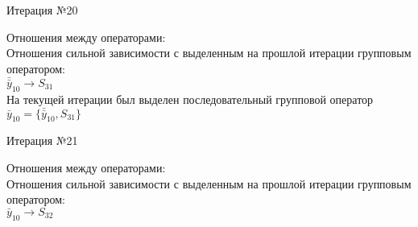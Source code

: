 \documentclass[a4paper,14pt]{article}
\begin{document}
\begin{center} Итерация №20 \end{center}
Отношения между операторами: \\
Отношения сильной зависимости с выделенным на прошлой итерации групповым оператором: \\ \newline
\begin{math}
    \bar{\bar{y}}_{10} \rightarrow S_{31}
\end{math}\\ \newline
%
На текущей итерации был выделен последовательный групповой оператор $\bar{y}_{10} = \{\bar{\bar{y}}_{10}, S_{31}\}$
\begin{center} Итерация №21 \end{center}
Отношения между операторами: \\
Отношения сильной зависимости с выделенным на прошлой итерации групповым оператором: \\ \newline
\begin{math}
    \bar{y}_{10} \rightarrow S_{32}
\end{math} \\ \\ \\ 
%
\end{document}
